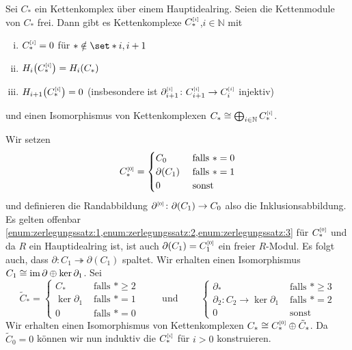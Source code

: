 \begin{satz}[{name={Zerlegungssatz}},label=zerlegungssatz]
	Sei $C_*$ ein Kettenkomplex über einem Hauptidealring.
	Seien die Kettenmodule von $C_*$ frei.
	Dann gibt es Kettenkomplexe $C_*^{\scriptscriptstyle[i]}$,$i \in \mathbb{N}$ mit 
	\begin{enumerate}[(i)]
		\item \label{enum:zerlegungssatz:1}$C_*^{\scriptscriptstyle[i]}=0$ für $* \notin \set*{i,i+1}$
		\item \label{enum:zerlegungssatz:2}$H_i \enbrace*{C_*^\ssbbrace{i}} = H_i(C_*)$
		\item \label{enum:zerlegungssatz:3}$H_{i+1} \enbrace*{C_*^\ssbbrace{i}}=0$ (insbesondere ist $\partial_{i+1}^{\scriptscriptstyle[i]} \colon C^{\scriptscriptstyle[i]}_{i+1} \to C_i^{\scriptscriptstyle[i]}$ injektiv)
	\end{enumerate}
	und einen Isomorphismus von Kettenkomplexen $C_* \cong \bigoplus_{i \in \mathbb{N}} C_*^{\scriptscriptstyle[i]}$.
\end{satz}
\begin{beweis}
	Wir setzen 
	\[
		C_*^{\scriptscriptstyle[0]} = \begin{cases}
			C_0 &\text{ falls }*=0\\
			\partial(C_1) &\text{ falls }*=1 \\
			0 &\text{ sonst} 
		\end{cases}
	\]
	und definieren die Randabbildung $\partial^{\scriptscriptstyle[0]} \colon \partial(C_1) \to C_0$ also die Inklusionsabbildung.
	Es gelten offenbar \cref{enum:zerlegungssatz:1,enum:zerlegungssatz:2,enum:zerlegungssatz:3} für $C_*^{\scriptscriptstyle[0]}$ und da $R$ ein Hauptidealring ist, ist auch $\partial(C_1)= C_1^{\scriptscriptstyle[0]}$ ein freier $R$-Modul.
	Es folgt auch, dass $\partial \colon C_1 \twoheadrightarrow \partial(C_1)$ spaltet.
	Wir erhalten einen Isomorphismus $C_1 \cong \operatorname{im} \partial \oplus \ker \partial_1$.
	Sei 
	\[
		\tilde{C}_* = \begin{cases}
			C_* &\text{ falls }*\ge 2\\
			\ker \partial_1 &\text{ falls } *=1 \\
			0 &\text{ falls } *=0 
		\end{cases}
		\qquad \text{ und } \qquad 
		\begin{cases}
			\partial_* &\text{ falls }*\ge 3\\
			\partial_2 \colon C_2 \to \ker \partial_1 &\text{ falls } *=2 \\
			0 &\text{ sonst} 
		\end{cases} 
	\]
	Wir erhalten einen Isomorphismus von Kettenkomplexen $C_* \cong C_*^{\scriptscriptstyle[0]} \oplus \tilde{C}_*$.
	Da $\tilde{C}_0=0$ können wir nun induktiv die $C_*^{\scriptscriptstyle[i]}$ für $i >0$ konstruieren.
\end{beweis}

